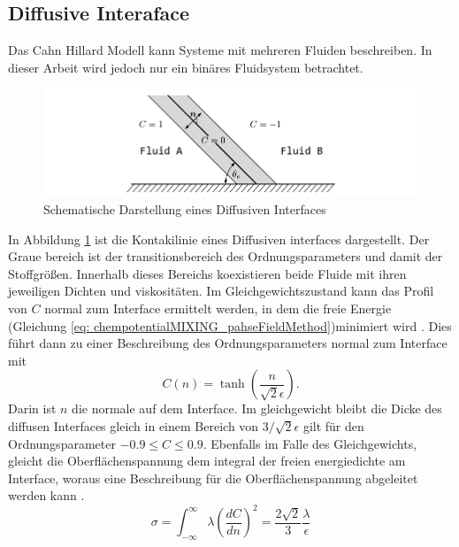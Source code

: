 \subsection{Diffusive Interaface}
Das Cahn Hillard Modell kann Systeme mit mehreren Fluiden beschreiben. In dieser Arbeit wird jedoch nur ein binäres Fluidsystem betrachtet. 
\begin{figure}[h]
    \centering
    \includegraphics[width=.95\textwidth]{Pictures/DiffusiveInterface.pdf}
    \caption{Schematische Darstellung eines Diffusiven Interfaces}
    \label{fig: DiffusiveInteraface}
\end{figure}
In Abbildung \ref{fig: DiffusiveInteraface} ist die Kontakilinie eines Diffusiven interfaces dargestellt. Der Graue bereich ist der transitionsbereich des Ordnungsparameters und damit der Stoffgrößen. Innerhalb dieses Bereichs koexistieren beide Fluide mit ihren jeweiligen Dichten und viskositäten. Im Gleichgewichtszustand kann das Profil von $C$ normal zum Interface ermittelt werden, in dem die freie Energie (Gleichung \ref{eq: chempotentialMIXING_pahseFieldMethod})minimiert wird \cite{cai2015NumericalSimulationWetting}. Dies führt dann zu einer Beschreibung des Ordnungsparameters normal zum Interface mit
\begin{equation}
    \label{eq: InterfactialNormalDirProfile}
    C(n) = \tanh\left(\frac{n}{\sqrt{2}\epsilon}\right).
\end{equation}
Darin ist $n$ die normale auf dem Interface. Im gleichgewicht bleibt die Dicke des diffusen Interfaces gleich in einem Bereich von $3/\sqrt{2}\epsilon$ gilt für den Ordnungsparameter $-0.9\leq C\leq0.9$. Ebenfalls im Falle des Gleichgewichts, gleicht die Oberflächenspannung dem integral der freien energiedichte am Interface, woraus eine Beschreibung für die Oberflächenspannung abgeleitet werden kann \cite{jacqmin2000ContactlineDynamicsDiffuse}. 
\begin{equation}
\label{eq: surfacetensionEqui}
    \sigma = \int_{-\infty}^{\infty}\lambda\left( \frac{dC}{dn}  \right)^{2}= \frac{2\sqrt{2}}{3} \frac{\lambda}{\epsilon}
\end{equation}





